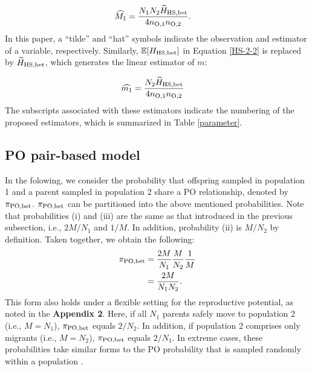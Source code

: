 \documentclass[12pt, English]{article}
\begin{document}
\begin{spacing}{1.9}
\begin{align}
\widehat{M_1} &= \frac{N_{1} N_{2} \widetilde{H}_{\rm HS, bet} } {4 n_{\rm O, 1} n_{\rm O, 2} }.
\label{HS-3}
\end{align}
In this paper, a ``tilde'' and ``hat'' symbols indicate the observation and estimator of a variable, respectively. Similarly, $\mathbb{E}[H_{\rm HS, bet}]$ in Equation \ref{HS-2-2} is replaced by $\widetilde{H}_{\rm HS, bet}$, which generates the linear estimator of $m$:

\begin{align}
\widehat{m_1} &= \frac{N_{2} \widetilde{H}_{\rm HS, bet} } {4 n_{\rm O, 1} n_{\rm O, 2} }
\label{HS-4}
\end{align}
The subscripts associated with these estimators indicate the numbering of the proposed estimators, which is summarized in Table \ref{parameter}. 

\begin{center}
\end{center}

\subsection{PO pair-based model}

In the folowing, we consider the probability that offspring sampled in population 1 and a parent sampled in population 2 share a PO relationship, denoted by $\pi_{\rm PO, bet}$. $\pi_{\rm PO, bet}$ can be partitioned into the above mentioned probabilities. Note that probabilities (i) and (iii) are the same as that introduced in the previous subsection, i.e., $2M/N_{1}$ and $1/M$. In addition, probability (ii) is $M/N_{2}$ by definition. Taken together, we obtain the following:
\begin{align}
\pi_{\rm PO,bet} &= \frac{2M}{N_{1}} \frac{M}{N_{2}} \frac{1}{M} \nonumber\\
&= \frac{2M}{N_{1}N_{2}}.
\label{PO-1}
\end{align}
This form also holds under a flexible setting for the reproductive potential, as noted in the {\bf Appendix 2}. Here, if all $N_1$ parents safely move to population 2 (i.e., $M = N_1$), $\pi_{\rm PO,bet}$ equals $2/N_2$. In addition, if population 2 comprises only migrants (i.e., $M = N_2$), $\pi_{\rm PO,bet}$ equals $2/N_1$. In extreme cases, these probabilities take similar forms to the PO probability that is sampled randomly within a population \cite[]{bravington2016close}. 


\end{spacing}
\end{document}

